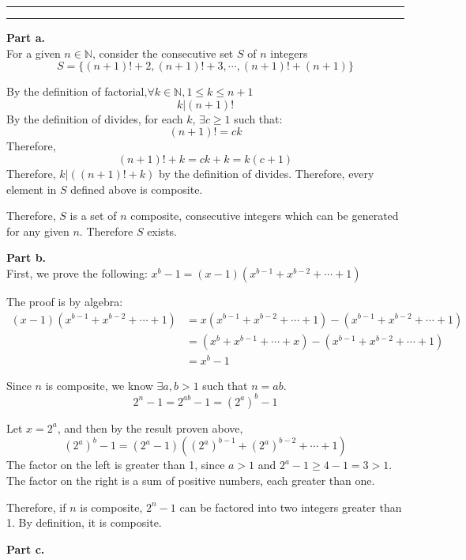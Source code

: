 \documentclass[11pt]{article}
\newcounter{questionCounter}
\newcounter{partCounter}[questionCounter]
\newenvironment{question}[2][\arabic{questionCounter}]{%
    \setcounter{partCounter}{0}%
    \vspace{.25in} \hrule \vspace{0.5em}%
        \noindent{\bf #2}%
    \vspace{0.8em} \hrule \vspace{.10in}%
    \addtocounter{questionCounter}{1}%
}{}
\begin{document}
\begin{question}{The Siege of Gondor}
\textbf{Part a.}\\
For a given $n\in\mathbb{N}$, consider the consecutive set $S$ of $n$ integers
$$S=\{(n+1)!+2, (n+1)!+3, \cdots, (n+1)!+(n+1)\}$$

By the definition of factorial,$\forall k\in\mathbb{N}, 1\leq k \leq n+1$
$$k|(n+1)!$$
By the definition of divides, for each $k$, $\exists c\geq 1$  such that:
$$(n+1)! = ck$$
Therefore,
$$(n+1)! + k = ck + k = k(c+1)$$
Therefore, $k|((n+1)! + k)$ by the definition of divides.
Therefore, every element in $S$ defined above is composite.

Therefore, $S$ is a set of $n$ composite, consecutive integers which can be 
generated for any given $n$. Therefore $S$ exists.

\textbf{Part b.}\\
First, we prove the following:
$x^b-1 = (x-1)(x^{b-1}+x^{b-2}+\cdots + 1)$

The proof is by algebra:
\begin{align*}
(x-1)( x^{ b-1}+x^{b-2}+ \cdots + 1) &= x(x^ {b-1}+x^{b-2} +\cdots+1)-(x^{b-1} + x^{b-2}+\cdots + 1)\\
&= (x^{b} + x^{b-1}+\cdots + x)-(x^{b-1} + x^{b-2} + \cdots+1)\\
&= x^b - 1
\end{align*}

Since $n$ is composite, we know $\exists a,b>1$ such that $n=ab$.
$$2^n - 1 = 2^{ab} - 1 =(2^a)^b - 1$$

Let $x = 2^a$, and then by the result proven above, 
$$(2^a)^b - 1 = (2^a-1)((2^a)^{b-1}+(2^a)^{b-2}+\cdots + 1)$$
The factor on the left is greater than 1, since $a>1$ and $2^a - 1 \geq 4-1 = 3 > 1$. The factor on the right is a sum of positive numbers, each greater than one. 

Therefore, if $n$ is composite, $2^n - 1$ can be factored into two integers greater than 1. By definition, it is composite. 

\textbf{Part c.}\\
\end{question}
\end{document}

